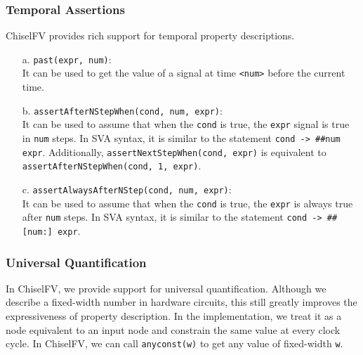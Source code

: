\documentclass[conference]{IEEEtran}
\theoremstyle{definition}
\begin{document}
\subsubsection{Temporal Assertions} 
ChiselFV provides rich support for temporal property descriptions.
\begin{itemize}
    \item[a.] \verb|past(expr, num)|: \\ It can be used to get the value of a signal at time \verb|<num>| before the current time.
    \item[b.] \verb|assertAfterNStepWhen(cond, num, expr)|: \\ 
    It can be used to assume that when the \verb|cond| is true, the \verb|expr| signal is true in \verb|num| steps.
    In SVA syntax, it is similar to the statement \verb|cond -> ##num expr|.
    Additionally, \verb|assertNextStepWhen(cond, expr)| is equivalent to \verb|assertAfterNStepWhen(cond, 1, expr)|.
    \item[c.] \verb|assertAlwaysAfterNStep(cond, num, expr)|: \\
    It can be used to assume that when the \verb|cond| is true, the \verb|expr| is always true after \verb|num| steps. In SVA syntax, it is similar to the statement \verb|cond -> ##[num:] expr|.
\end{itemize}

\subsubsection{Universal Quantification}
In ChiselFV, we provide support for universal quantification. Although we describe a fixed-width number in hardware circuits, this still greatly improves the expressiveness of property description. In the implementation, we treat it as a node equivalent to an input node and constrain the same value at every clock cycle. In ChiselFV, we can call \verb|anyconst(w)| to get any value of fixed-width \verb|w|.
\end{document}
